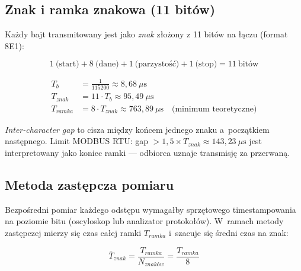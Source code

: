\documentclass[12pt,a4paper]{article}
\begin{document}
\subsection*{Znak i ramka znakowa (11 bitów)}

Każdy bajt transmitowany jest jako \textit{znak} złożony z 11 bitów na łączu (format 8E1):

$$1\ \text{(start)} + 8\ \text{(dane)} + 1\ \text{(parzystość)} + 1\ \text{(stop)} = 11\ \text{bitów}$$

\begin{align*}
T_b       &= \frac{1}{115200} \approx 8{,}68\ \mu\text{s} \\
T_{znak}  &= 11 \cdot T_b \approx 95{,}49\ \mu\text{s} \\
T_{ramka} &= 8 \cdot T_{znak} \approx 763{,}89\ \mu\text{s} \quad \text{(minimum teoretyczne)}
\end{align*}

\textit{Inter-character gap} to cisza między końcem jednego znaku a~początkiem
następnego. Limit MODBUS RTU: gap $> 1{,}5 \times T_{znak} \approx 143{,}23\ \mu\text{s}$
jest interpretowany jako koniec ramki — odbiorca uznaje transmisję za przerwaną.

\subsection*{Metoda zastępcza pomiaru}

Bezpośredni pomiar każdego odstępu wymagałby sprzętowego timestampowania
na poziomie bitu (oscyloskop lub analizator protokołów). W~ramach metody
zastępczej mierzy się czas całej ramki $T_{ramka}$ i~szacuje się średni
czas na znak:

$$\bar{T}_{znak} = \frac{T_{ramka}}{N_{znaków}} = \frac{T_{ramka}}{8}$$
\end{document}
